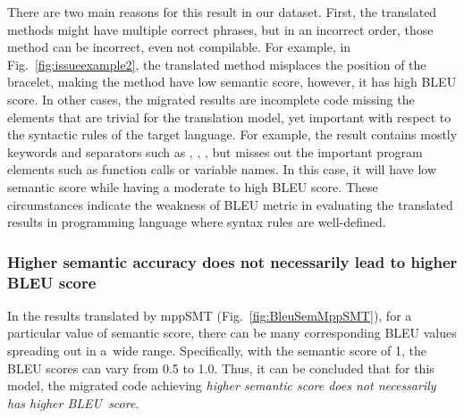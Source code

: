 There are two main reasons for this result in our dataset.  First, the
translated methods might have multiple correct phrases, but in an
incorrect order, those method can be incorrect, even not compilable.
%
For example, in Fig.~\ref{fig:issueexample2}, the translated method
misplaces the position of the bracelet, making the method have low
semantic score, however, it has high BLEU score.
%
In other cases, the migrated results are incomplete code missing the
elements that are trivial for the translation model, yet important
with respect to the syntactic rules of the target language. For
example, the result contains mostly keywords and separators such as
, , \code{()}, but misses out the important
program elements such as function calls or variable names. In this
case, it will have low semantic score while having a moderate to high
BLEU score. These circumstances indicate the weakness of BLEU metric
in evaluating the translated results in programming language where
syntax rules are well-defined.


\subsubsection{{\bf Higher semantic accuracy does not necessarily lead to
higher BLEU score}} In the results translated by mppSMT
(Fig.~\ref{fig:BleuSemMppSMT}), for a particular value of semantic
score, there can be many corresponding BLEU values spreading out in
a~wide range. Specifically, with the semantic score of 1, the BLEU
scores can vary from 0.5 to 1.0. Thus, it can be concluded
that for this model, the migrated code achieving {\em higher semantic score does not necessarily has higher BLEU~score}.

